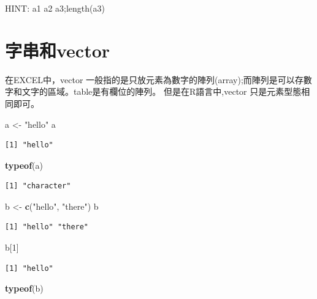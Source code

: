 \documentclass[]{book}
\newenvironment{Shaded}{\begin{snugshade}}{\end{snugshade}}
\newcommand{\DecValTok}[1]{\textcolor[rgb]{0.00,0.00,0.81}{#1}}
\newcommand{\KeywordTok}[1]{\textcolor[rgb]{0.13,0.29,0.53}{\textbf{#1}}}
\newcommand{\NormalTok}[1]{#1}
\newcommand{\StringTok}[1]{\textcolor[rgb]{0.31,0.60,0.02}{#1}}
\theoremstyle{definition}
\theoremstyle{definition}
\theoremstyle{definition}
\theoremstyle{remark}
\begin{document}
HINT: a1 a2 a3;length(a3)

\hypertarget{vector}{%
\section{字串和vector}\label{vector}}

在EXCEL中，vector
一般指的是只放元素為數字的陣列(array);而陣列是可以存數字和文字的區域。table是有欄位的陣列。
但是在R語言中,vector 只是元素型態相同即可。

\begin{Shaded}
\begin{Highlighting}[]
\NormalTok{a <-}\StringTok{ "hello"}
\NormalTok{a}
\end{Highlighting}
\end{Shaded}

\begin{verbatim}
[1] "hello"
\end{verbatim}

\begin{Shaded}
\begin{Highlighting}[]
\KeywordTok{typeof}\NormalTok{(a)}
\end{Highlighting}
\end{Shaded}

\begin{verbatim}
[1] "character"
\end{verbatim}

\begin{Shaded}
\begin{Highlighting}[]
\NormalTok{b <-}\StringTok{ }\KeywordTok{c}\NormalTok{(}\StringTok{"hello"}\NormalTok{, }\StringTok{"there"}\NormalTok{)}
\NormalTok{b}
\end{Highlighting}
\end{Shaded}

\begin{verbatim}
[1] "hello" "there"
\end{verbatim}

\begin{Shaded}
\begin{Highlighting}[]
\NormalTok{b[}\DecValTok{1}\NormalTok{]}
\end{Highlighting}
\end{Shaded}

\begin{verbatim}
[1] "hello"
\end{verbatim}

\begin{Shaded}
\begin{Highlighting}[]
\KeywordTok{typeof}\NormalTok{(b)}
\end{Highlighting}
\end{Shaded}
\end{document}

